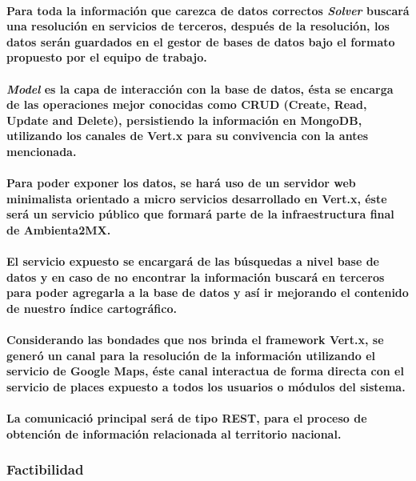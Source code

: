     \paragraph{Para toda la información que carezca de datos correctos \textbf{\emph{Solver}} buscará una resolución en servicios de terceros, después de la resolución, los datos serán guardados en el gestor de bases de datos bajo el formato propuesto por el equipo de trabajo.}
    \paragraph{\textbf{\emph{Model}} es la capa de interacción con la base de datos, ésta se encarga de las operaciones mejor conocidas como CRUD (Create, Read, Update and Delete),  persistiendo la información en MongoDB, utilizando los canales de Vert.x para su convivencia con la antes mencionada.}
    \paragraph{Para poder exponer los datos, se hará uso de un servidor web minimalista orientado a micro servicios desarrollado en Vert.x, éste será un servicio público que formará parte de la infraestructura final de Ambienta2MX.}
    \paragraph{El servicio expuesto se encargará de las búsquedas a nivel base de datos y en caso de no encontrar la información buscará en terceros para poder agregarla a la base de datos y así ir mejorando el contenido de nuestro índice cartográfico.}
    \paragraph{Considerando las bondades que nos brinda el framework Vert.x, se generó un canal para la resolución de la información utilizando el servicio de Google Maps, éste canal interactua de forma directa con el servicio de places expuesto a todos los usuarios o módulos del sistema.}
    \paragraph{La comunicació principal será de tipo REST, para el proceso de 
    obtención de información relacionada al territorio nacional.}
  \subsubsection{Factibilidad}      

